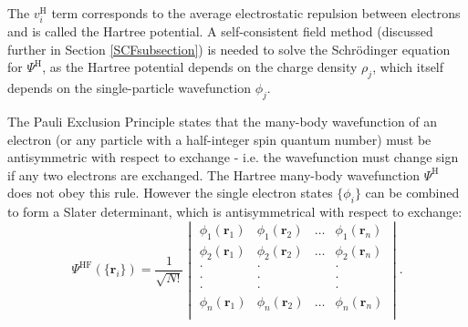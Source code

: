 The $v_i^\textrm{H}$ term corresponds to the average electrostatic repulsion between electrons and is called the Hartree potential. A self-consistent field method (discussed further in Section \ref{SCFsubsection}) is needed to solve the Schr\"{o}dinger equation for $\Psi^{\textrm{H}}$, as the Hartree potential depends on the charge density $\rho_j$, which itself depends on the single-particle wavefunction $\phi_j$.

The Pauli Exclusion Principle states that the many-body wavefunction of an electron (or any particle with a half-integer spin quantum number) must be antisymmetric with respect to exchange - i.e. the wavefunction must change sign if any two electrons are exchanged.\autocite{Kaxiras2007} The Hartree many-body wavefunction $\Psi^{\textrm{H}}$ does not obey this rule. However the single electron states $\{\phi_i\}$ can be combined to form a Slater determinant,\autocite{Slater1929} which is antisymmetrical with respect to exchange:
\begin{equation}
\Psi^{\textrm{HF}}(\{\textbf{r}_i\}) = \frac{1}{\sqrt{N!}}
\begin{vmatrix}
\phi_1(\textbf{r}_1)&\phi_1(\textbf{r}_2)&\ldots&\phi_1(\textbf{r}_n) \\
\phi_2(\textbf{r}_1)&\phi_2(\textbf{r}_2)&\ldots&\phi_2(\textbf{r}_n) \\
\cdot & \cdot & & \cdot \\
\cdot & \cdot & & \cdot \\
\cdot & \cdot & & \cdot \\
\phi_n(\textbf{r}_1)&\phi_n(\textbf{r}_2)&\ldots&\phi_n(\textbf{r}_n) \\
\end{vmatrix}.
\end{equation}

